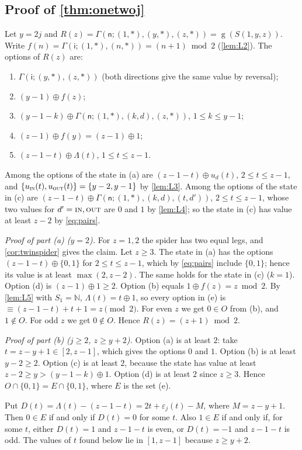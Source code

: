 \documentclass[11pt]{amsart}
\theoremstyle{definition}
\theoremstyle{remark}
\newcommand{\gv}{\operatorname{g}}           %
\newcommand{\sn}{\mathsf{n}}
\newcommand{\si}{\mathsf{i}}
\newcommand{\Sp}{S}
\newcommand{\free}{\ast}
\newcommand{\NN}{\mathbb{N}}
\newcommand{\IN}{\textup{\textsc{in}}}
\newcommand{\OUT}{\textup{\textsc{out}}}
\begin{document}
\subsection{Proof of \texorpdfstring{\cref{thm:onetwoj}}{Theorem 9.1}}
Let $y=2j$ and $R(z)=\Gamma(\sn;(1,\free),(y,\free),(z,\free))=\gv(\Sp(1,y,z))$. Write $f(n)=\Gamma(\si;(1,\free),(n,\free))=(n+1)\bmod 2$ (\cref{lem:L2}). The options of $R(z)$ are:
\begin{enumerate}[label=(\alph*),leftmargin=*]
\item $\Gamma(\si;(y,\free),(z,\free))$ (both directions give the same value by reversal);
\item $(y-1)\oplus f(z)$;
\item $(y-1-k)\oplus\Gamma(\sn;(1,\free),(k,d),(z,\free))$, $1\le k\le y-1$;
\item $(z-1)\oplus f(y)=(z-1)\oplus1$;
\item $(z-1-t)\oplus \Lambda(t)$, $1\le t\le z-1$.
\end{enumerate}
Among the options of the state in (a) are $(z-1-t)\oplus u_d(t)$, $2\le t\le z-1$, and $\{u_\IN(t),u_\OUT(t)\}=\{y-2,y-1\}$ by \cref{lem:L3}. Among the options of the state in (c) are $(z-1-t)\oplus\Gamma(\sn;(1,\free),(k,d),(t,d'))$, $2\le t\le z-1$, whose two values for $d'=\IN,\OUT$ are $0$ and $1$ by \cref{lem:L4}; so the state in (c) has value at least $z-2$ by \eqref{eq:pairs}.

\emph{Proof of part (a) ($y=2$).} For $z=1,2$ the spider has two equal legs, and \cref{cor:twinspider} gives the claim. Let $z\ge3$. The state in (a) has the options $(z-1-t)\oplus\{0,1\}$ for $2\le t\le z-1$, which by \eqref{eq:pairs} include $\{0,1\}$; hence its value is at least $\max(2,z-2)$. The same holds for the state in (c) ($k=1$). Option (d) is $(z-1)\oplus1\ge2$. Option (b) equals $1\oplus f(z)=z\bmod 2$. By \cref{lem:L5} with $S_1=\NN$, $\Lambda(t)=t\oplus1$, so every option in (e) is $\equiv(z-1-t)+t+1=z\pmod 2$. For even $z$ we get $0\in O$ from (b), and $1\notin O$. For odd $z$ we get $0\notin O$. Hence $R(z)=(z+1)\bmod 2$.

\emph{Proof of part (b) ($j\ge2$, $z\ge y+2$).} Option (a) is at least $2$: take $t=z-y+1\in[2,z-1]$, which gives the options $0$ and $1$. Option (b) is at least $y-2\ge 2$. Option (c) is at least $2$, because the state has value at least $z-2\ge y>(y-1-k)\oplus 1$. Option (d) is at least $2$ since $z\ge3$. Hence $O\cap\{0,1\}=E\cap\{0,1\}$, where $E$ is the set (e).

Put $D(t)=\Lambda(t)-(z-1-t)=2t+\varepsilon_j(t)-M$, where $M=z-y+1$. Then $0\in E$ if and only if $D(t)=0$ for some $t$. Also $1\in E$ if and only if, for some $t$, either $D(t)=1$ and $z-1-t$ is even, or $D(t)=-1$ and $z-1-t$ is odd. The values of $t$ found below lie in $[1,z-1]$ because $z\ge y+2$.
\end{document}
